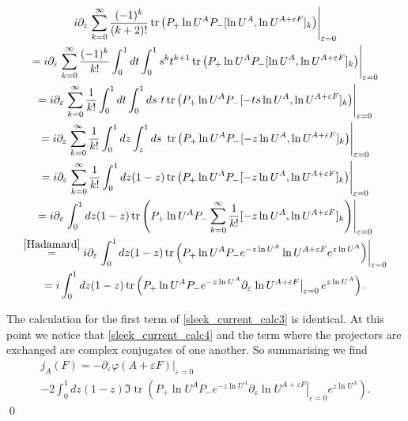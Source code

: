 \documentclass[b5paper,draft,openbib,12pt]{memoir}
\DeclareMathOperator{\tr}{tr}
\begin{document}
\begin{multline}\label{sleek_current_calc4}
 i  \partial_{\varepsilon} \left.\sum_{k=0}^\infty \frac{(-1)^k}{(k+2)!}  \tr\left(P_+ \ln U^A P_-[\ln U^A,\ln U^{A+\varepsilon F} ]_{k}\right) \right|_{\varepsilon=0}\\
= i  \partial_{\varepsilon} \left.\sum_{k=0}^\infty \frac{(-1)^k}{k!} \int_0^1 d t \int_0^1 s^k t^{k+1}
\tr\left(P_+ \ln U^A P_-[\ln U^A,\ln U^{A+\varepsilon F} ]_{k}\right) \right|_{\varepsilon=0}\\
= i  \partial_{\varepsilon} \left.\sum_{k=0}^\infty \frac{1}{k!} \int_0^1 d t \int_0^1 ds\ t
\tr\left(P_+ \ln U^A P_-[ -t s \ln U^A,\ln U^{A+\varepsilon F} ]_{k}\right) \right|_{\varepsilon=0}\\
= i  \partial_{\varepsilon} \left.\sum_{k=0}^\infty \frac{1}{k!} \int_0^1 d z \int_z^1 ds\ 
\tr\left(P_+ \ln U^A P_-[ -z \ln U^A,\ln U^{A+\varepsilon F} ]_{k}\right) \right|_{\varepsilon=0}\\
= i  \partial_{\varepsilon} \left.\sum_{k=0}^\infty \frac{1}{k!} \int_0^1 d z (1-z)
\tr\left(P_+ \ln U^A P_-[ -z \ln U^A,\ln U^{A+\varepsilon F} ]_{k}\right) \right|_{\varepsilon=0}\\
= i  \partial_{\varepsilon} \left. \int_0^1 d z (1-z) 
\tr\left(P_+ \ln U^A P_- \sum_{k=0}^\infty \frac{1}{k!} [ -z \ln U^A,\ln U^{A+\varepsilon F} ]_{k}\right) \right|_{\varepsilon=0}\\
\stackrel{\eqref{Hadamard}}{=} i  \partial_{\varepsilon} \left. \int_0^1 d z (1-z) 
\tr\left(P_+ \ln U^A P_- e^{ -z \ln U^A}\ln U^{A+\varepsilon F} e^{ z \ln U^A}\right) \right|_{\varepsilon=0}\\
=i  \int_0^1 d z (1-z) 
\tr\left(P_+ \ln U^A P_- e^{ -z \ln U^A} \partial_{\varepsilon} \left. \ln U^{A+\varepsilon F}\right|_{\varepsilon=0} e^{ z \ln U^A}\right) .
\end{multline}

The calculation for the first term of \eqref{sleek_current_calc3} is identical.
At this point we notice that \eqref{sleek_current_calc4} and the term where the 
projectors are exchanged are complex conjugates of one another. So summarising we find
\begin{multline*}
j_A(F)=- \partial_{\varepsilon} \left. \varphi (A+\varepsilon F) \right|_{\varepsilon=0}\\
-2\int_0^1 d z (1-z)  \Im \tr\left(P_+ \ln U^A P_- e^{ -z \ln U^A} \partial_{\varepsilon} \left. \ln U^{A+\varepsilon F}\right|_{\varepsilon=0} e^{ z \ln U^A}\right).
\end{multline*}
\qed
\end{document}
